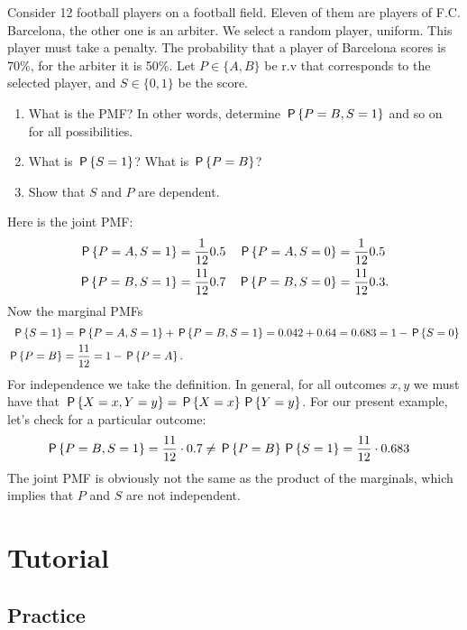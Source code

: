 \begin{exercise}
Consider 12 football players on a football field.
Eleven of them are players of F.C. Barcelona, the other one is an arbiter.
We select a random player, uniform.
This player must take a penalty.
The probability that a player of Barcelona scores is 70\%, for the arbiter it is 50\%.
Let $P\in \{A, B\}$ be r.v that corresponds to the selected player, and $S\in\{0,1\}$ be the score.
\begin{enumerate}
\item What is the PMF? In other words, determine $\P{P = B, S=1}$ and so on for all possibilities.
\item What is $\P{S=1}$? What is $\P{P=B}$?
\item Show that $S$ and $P$ are dependent.
\end{enumerate}
\begin{solution}
Here is the joint PMF:
\begin{align}
\P{P=A, S=1} &= \frac{1}{12}0.5 & \P{P=A, S=0} &= \frac{1}{12}0.5 \\
\P{P=B, S=1} &= \frac{11}{12}0.7 & \P{P=B, S=0} &= \frac{11}{12}0.3.
\end{align}
Now the marginal PMFs
\begin{align*}
\P{S=1}  &= \P{P=A, S=1} + \P{P=B, S=1} = 0.042 + 0.64 = 0.683 = 1-\P{S=0}\\
\P{P=B}  &= \frac{11}{12} = 1-\P{P=A}.
\end{align*}
For independence we take the definition.
In general, for all outcomes $x,y$ we must have that $\P{X=x, Y=y} = \P{X=x}\P{Y=y}$.
For our present example, let's check for  a particular outcome:
\begin{align*}
\P{P=B, S=1} &= \frac{11}{12}\cdot0.7 \neq \P{P=B}\P{S=1} = \frac{11}{12} \cdot 0.683
\end{align*}
The joint PMF is obviously not the same as the product of the marginals, which implies that $P$ and $S$ are not independent.
\end{solution}
\end{exercise}


\section{Tutorial}
\label{sec:tutorial}

\subsection{Practice}

